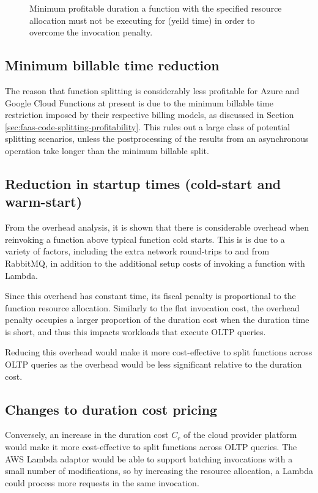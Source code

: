 \begin{figure*}[t]
    \begin{center}
        
    \end{center}
    \caption{Minimum profitable duration a \faas{} function with the specified resource allocation must not be executing for (yeild time) in order to overcome the invocation penalty.}
    \label{fig:faas-min-yield-by-mem-alloc}
\end{figure*}

\subsection{Minimum billable time reduction}
The reason that function splitting is considerably less profitable for Azure and Google Cloud Functions at present is due to the minimum billable time restriction imposed by their respective billing models, as discussed in Section \ref{sec:faas-code-splitting-profitability}. This rules out a large class of potential splitting scenarios, unless the postprocessing of the results from an asynchronous operation take longer than the minimum billable split.

\subsection{Reduction in startup times (cold-start and warm-start)}
From the overhead analysis, it is shown that there is considerable overhead when reinvoking a function above typical function cold starts. This is is due to a variety of factors, including the extra network round-trips to and from RabbitMQ, in addition to the additional setup costs of invoking a function with Lambda.

Since this overhead has constant time, its fiscal penalty is proportional to the function resource allocation. Similarly to the flat invocation cost, the overhead penalty occupies a larger proportion of the duration cost when the duration time is short, and thus this impacts workloads that execute OLTP queries.

Reducing this overhead would make it more cost-effective to split functions across OLTP queries as the overhead would be less significant relative to the duration cost.

\subsection{Changes to duration cost pricing}
Conversely, an increase in the duration cost $C_r$ of the cloud provider platform would make it more cost-effective to split functions across OLTP queries. The \faaasc{} AWS Lambda adaptor would be able to support batching invocations with a small number of modifications, so by increasing the resource allocation, a Lambda could process more requests in the same invocation.

